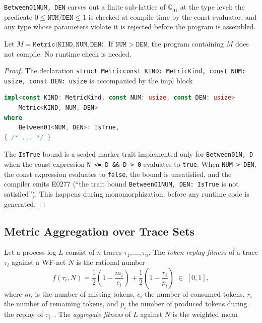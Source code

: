 \texttt{Between01\langle NUM, DEN\rangle} carves out a finite sub-lattice of
$\mathbb{Q}_{01}$ at the type level: the predicate $0 \leq
\mathtt{NUM} / \mathtt{DEN} \leq 1$ is checked at compile time by the const
evaluator, and any type whose parameters violate it is rejected before the
program is assembled.

\begin{theorem}
Let $M = \mathtt{Metric\langle KIND, NUM, DEN\rangle}$. If
$\mathtt{NUM} > \mathtt{DEN}$, the program containing $M$ does not compile.
No runtime check is needed.
\end{theorem}

\begin{proof}
The declaration \texttt{struct Metric\langle const KIND: MetricKind, const
NUM: usize, const DEN: usize\rangle} is accompanied by the impl block
\begin{lstlisting}[language=Rust]
impl<const KIND: MetricKind, const NUM: usize, const DEN: usize>
    Metric<KIND, NUM, DEN>
where
    Between01<NUM, DEN>: IsTrue,
{ /* ... */ }
\end{lstlisting}
The \texttt{IsTrue} bound is a sealed marker trait implemented only for
\texttt{Between01\langle N, D\rangle} when the const expression
\texttt{N <= D \&\& D > 0} evaluates to \texttt{true}. When \texttt{NUM >
DEN}, the const expression evaluates to \texttt{false}, the bound is
unsatisfied, and the compiler emits E0277 (``the trait bound
\texttt{Between01\langle NUM, DEN\rangle: IsTrue} is not satisfied''). This
happens during monomorphization, before any runtime code is generated.
\end{proof}

\subsection{Metric Aggregation over Trace Sets}

Let a process log $L$ consist of $n$ traces $\tau_1, \ldots, \tau_n$. The
\emph{token-replay fitness} of a trace $\tau_i$ against a WF-net $N$ is the
rational number
\[
  f(\tau_i, N) = \frac{1}{2}\left(1 - \frac{m_i}{c_i}\right)
               + \frac{1}{2}\left(1 - \frac{r_i}{p_i}\right)
               \;\in\; [0,1],
\]
where $m_i$ is the number of missing tokens, $c_i$ the number of consumed
tokens, $r_i$ the number of remaining tokens, and $p_i$ the number of produced
tokens during the replay of $\tau_i$~\cite{rozinat2008conformance}. The
\emph{aggregate fitness} of $L$ against $N$ is the weighted mean

